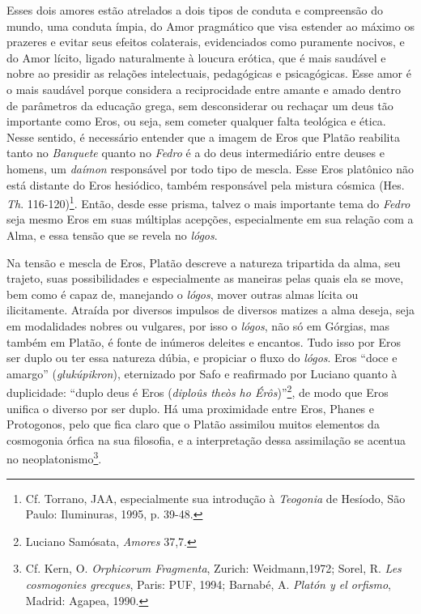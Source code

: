 Esses dois amores estão atrelados a dois tipos de conduta e compreensão
do mundo, uma conduta ímpia, do Amor pragmático que visa estender ao
máximo os prazeres e evitar seus efeitos colaterais, evidenciados como
puramente nocivos, e do Amor lícito, ligado naturalmente à loucura
erótica, que é mais saudável e nobre ao presidir as relações
intelectuais, pedagógicas e psicagógicas. Esse amor é o mais saudável
porque considera a reciprocidade entre amante e amado dentro de
parâmetros da educação grega, sem desconsiderar ou rechaçar um deus tão
importante como Eros, ou seja, sem cometer qualquer falta teológica e
ética. Nesse sentido, é necessário entender que a imagem de Eros que
Platão reabilita tanto no \emph{Banquete} quanto no \emph{Fedro} é a do
deus intermediário entre deuses e homens, um \emph{daímon} responsável
por todo tipo de mescla. Esse Eros platônico não está distante do Eros
hesiódico, também responsável pela mistura cósmica
(Hes. \emph{Th}. 116-120)\footnote{Cf. Torrano, JAA, especialmente sua
  introdução à \emph{Teogonia} de Hesíodo, São Paulo: Iluminuras, 1995,
  p. 39-48.}. Então, desde esse prisma, talvez o mais importante tema
do \emph{Fedro} seja mesmo Eros em suas
múltiplas acepções, especialmente em sua relação com a Alma, e essa
tensão que se revela no \emph{lógos}.

Na tensão e mescla de Eros, Platão descreve a natureza tripartida da
alma, seu trajeto, suas possibilidades e especialmente as maneiras pelas
quais ela se move, bem como é capaz de, manejando o \emph{lógos}, mover
outras almas lícita ou ilicitamente. Atraída por diversos impulsos de
diversos matizes a alma deseja, seja em modalidades nobres ou
vulgares, por isso o \emph{lógos}, não só em Górgias, mas também em
Platão, é fonte de inúmeros deleites e encantos. Tudo isso por Eros ser
duplo ou ter essa natureza dúbia, e propiciar o fluxo do \emph{lógos}.
Eros ``doce e amargo'' (\emph{glukúpikron}), eternizado por Safo e
reafirmado por Luciano quanto à duplicidade: ``duplo deus é Eros
(\emph{diploûs theòs ho Érôs})''\footnote{Luciano Samósata,
  \emph{Amores} 37,7.}, de modo que Eros unifica o diverso por
ser duplo. Há uma proximidade entre Eros, Phanes e Protogonos, pelo que
fica claro que o Platão assimilou muitos elementos da cosmogonia órfica
na sua filosofia, e a interpretação dessa assimilação se acentua no
neoplatonismo\footnote{Cf. Kern, O. \emph{Orphicorum Fragmenta},
  Zurich: Weidmann,1972; Sorel, R. \emph{Les cosmogonies grecques},
  Paris: PUF, 1994; Barnabé, A. \emph{Platón y el orfismo}, Madrid:
  Agapea, 1990.}.

